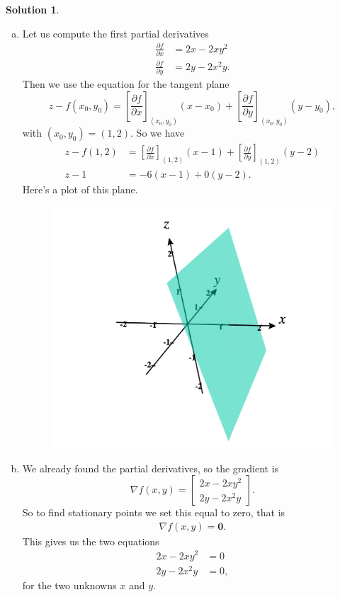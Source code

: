 \documentclass[12pt]{report} %
\theoremstyle{definition}
\newtheorem{solution}{Solution}
\begin{document}
\begin{solution}~
\begin{enumerate}[(a)]
    \item Let us compute the first partial derivatives
    \begin{align*}
        \frac{\partial f}{\partial x} &= 2x-2xy^2\\
        \frac{\partial f}{\partial y} &= 2y-2x^2y.
    \end{align*}
    Then we use the equation for the tangent plane
    \[
    z-f(x_0,y_0)= \left[ \frac{\partial f}{\partial x} \right]_{(x_0,y_0)} (x-x_0) + \left[\frac{\partial f}{\partial y} \right]_{(x_0,y_0)} (y-y_0),
    \]
    with $(x_0,y_0)=(1,2).$  So we have
    \begin{align*}
        z-f(1,2)&= \left[ \frac{\partial f}{\partial x}\right]_{(1,2)}(x-1)+\left[\frac{\partial f}{\partial y}\right]_{(1,2)}(y-2)\\
        z-1&= -6(x-1)+0(y-2).
    \end{align*}
    Here's a plot of this plane.
    \begin{figure}[H]
        \centering
        \includegraphics[width=.6\textwidth]{Images/tangent_plane.png}
    \end{figure}
    \item We already found the partial derivatives, so the gradient is
    \[
    \nabla f(x,y) = \begin{bmatrix} 2x-2xy^2 \\ 2y-2x^2y \end{bmatrix}.
    \]
    So to find stationary points we set this equal to zero, that is
    \begin{align*}
        \nabla f(x,y) = \mathbf{0}.
    \end{align*}
    This gives us the two equations
    \begin{align}
        2x-2xy^2 &= 0\\
        2y-2x^2y&=0,
    \end{align}
    for the two unknowns $x$ and $y$.
    

\end{enumerate}
\end{solution}
\end{document}

